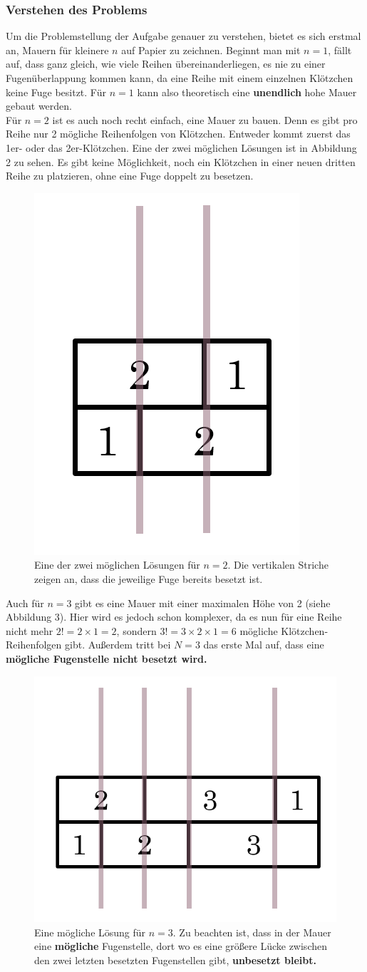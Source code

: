 \documentclass[a4paper,12pt]{article}
\begin{document}
\subsubsection{Verstehen des Problems}
Um die Problemstellung der Aufgabe genauer zu verstehen, bietet es sich erstmal an, Mauern für kleinere $n$ auf Papier zu zeichnen.
Beginnt man mit $n = 1$, fällt auf, dass ganz gleich, wie viele Reihen übereinanderliegen, es nie zu einer Fugenüberlappung kommen kann, da eine Reihe mit einem einzelnen Klötzchen keine Fuge besitzt.
Für $n = 1$ kann also theoretisch eine \textbf{unendlich} hohe Mauer gebaut werden.
\\[0.4cm]
Für $n = 2$ ist es auch noch recht einfach, eine Mauer zu bauen. Denn es gibt pro Reihe nur 2 mögliche Reihenfolgen von Klötzchen. Entweder kommt zuerst das 1er- oder das 2er-Klötzchen. 
Eine der zwei möglichen Lösungen ist in Abbildung 2 zu sehen. Es gibt keine Möglichkeit, noch ein Klötzchen in einer neuen dritten Reihe zu platzieren, ohne eine Fuge doppelt zu besetzen.
\begin{figure}[H]
    \centering
    \includegraphics[width=0.25\linewidth]{Bilder/Aufgabe1/Loesung_N2.png}
    \caption{Eine der zwei möglichen Lösungen für $n = 2$. Die vertikalen Striche zeigen an, dass die jeweilige Fuge bereits besetzt ist.}
\end{figure}

Auch für $n = 3$ gibt es eine Mauer mit einer maximalen Höhe von 2 (siehe Abbildung 3). Hier wird es jedoch schon komplexer, da es nun für eine Reihe nicht mehr $2! = 2\times1 = 2$, sondern $3! = 3\times2\times1 = 6$ mögliche Klötzchen-Reihenfolgen gibt.
Außerdem tritt bei $N = 3$ das erste Mal auf, dass eine \textbf{mögliche Fugenstelle nicht besetzt wird.}
\begin{figure}[H]
    \centering
    \includegraphics[width=0.4\linewidth]{Bilder/Aufgabe1/Loesung_N3.png}
    \caption{Eine mögliche Lösung für $n = 3$. Zu beachten ist, dass in der Mauer eine \textbf{mögliche} Fugenstelle, dort wo es eine größere Lücke zwischen den zwei letzten besetzten Fugenstellen gibt, \textbf{unbesetzt bleibt.}}
\end{figure}
\end{document}
